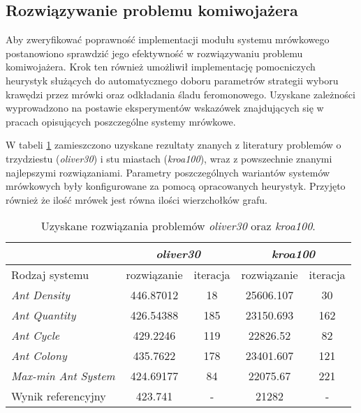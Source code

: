 {{        \subsection{Rozwiązywanie problemu komiwojażera}
        {
            Aby zweryfikować poprawność implementacji modułu systemu mrówkowego postanowiono sprawdzić jego efektywność
            w rozwiązywaniu problemu komiwojażera. Krok ten również umożliwił implementację pomocniczych heurystyk
            służących do automatycznego doboru parametrów strategii wyboru krawędzi przez mrówki oraz odkładania śladu
            feromonowego. Uzyskane zależności wyprowadzono na postawie eksperymentów wskazówek znajdujących się w
            pracach opisujących poszczególne systemy mrówkowe\cite{Dorigo1991AntSA, Dorigo1997AntCS,
            Sttzle2000MAXMINAS}.

            W tabeli \ref{tab:impl-tsp-results} zamieszczono uzyskane rezultaty znanych z literatury problemów o
            trzydziestu (\textit{oliver30}) i stu miastach (\textit{kroa100}), wraz z powszechnie znanymi najlepszymi
            rozwiązaniami. Parametry poszczególnych wariantów systemów mrówkowych były konfigurowane za pomocą
            opracowanych heurystyk. Przyjęto również że ilość mrówek jest równa ilości wierzchołków grafu.

            \begin{table}
                \centering
                \begin{tabular}{ |l|c c|c c| }
                    \hline
                    & \multicolumn{2}{c|}{\textit{oliver30}} & \multicolumn{2}{c|}{\textit{kroa100}} \\
                    \hline
                    Rodzaj systemu & rozwiązanie & iteracja & rozwiązanie & iteracja \\
                    \hline
                    \textit{Ant Density} & 446.87012 & 18 & 25606.107 & 30 \\
                    \textit{Ant Quantity} & 426.54388 & 185 & 23150.693 & 162 \\
                    \textit{Ant Cycle} & 429.2246 & 119 & 22826.52 & 82 \\
                    \textit{Ant Colony} & 435.7622 & 178 & 23401.607 & 121 \\
                    \textit{Max-min Ant System} & 424.69177 & 84 & 22075.67 & 221 \\
                    \hline
                    Wynik referencyjny & 423.741 & - & 21282 & - \\
                    \hline
                \end{tabular}
                \caption{Uzyskane rozwiązania problemów \textit{oliver30} oraz \textit{kroa100}.}
                \label{tab:impl-tsp-results}
            \end{table}
        }
    }
}
